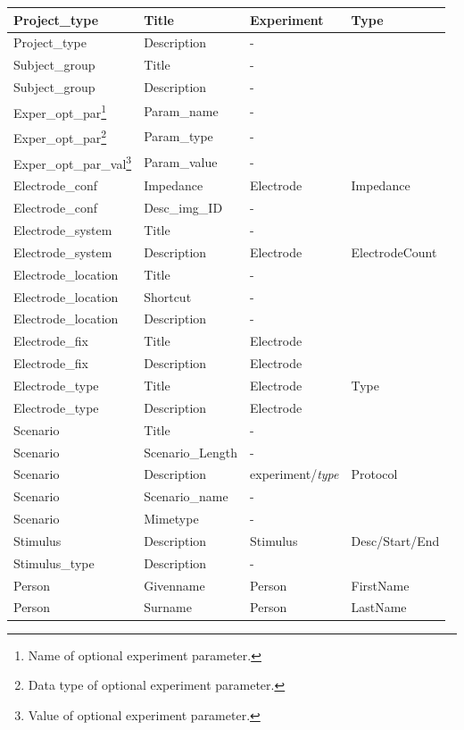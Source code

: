 \begin{longtable}{|l|l||l|l|}
 \hline 	 Project\_type & Title & Experiment & Type \\ 
 \hline 	 Project\_type & Description & - &  \\ 
 \hline 	 Subject\_group & Title &-  &  \\ 
 \hline 	 Subject\_group & Description & - &  \\ 
 \hline 	 Exper\_opt\_par\footnote{Name of optional experiment parameter.} & Param\_name & - &  \\ 
 \hline 	 Exper\_opt\_par\footnote{Data type of optional experiment parameter.} & Param\_type & - &  \\ 
 \hline 	 Exper\_opt\_par\_val\footnote{Value of optional experiment parameter.} & Param\_value & - &  \\ 
 \hline 	 Electrode\_conf & Impedance & Electrode & Impedance \\ 
 \hline 	 Electrode\_conf & Desc\_img\_ID & - &  \\ 
 \hline 	 Electrode\_system & Title & - &  \\ 
 \hline 	 Electrode\_system & Description & Electrode & ElectrodeCount \\ 
 \hline 	 Electrode\_location & Title & - &  \\ 
 \hline 	 Electrode\_location & Shortcut & - &  \\ 
 \hline 	 Electrode\_location & Description & - &  \\ 
 \hline 	 Electrode\_fix & Title & Electrode &  \\ 
 \hline 	 Electrode\_fix & Description & Electrode &  \\ 
 \hline 	 Electrode\_type & Title & Electrode & Type \\ 
 \hline 	 Electrode\_type & Description & Electrode &  \\ 
 \hline 	Scenario  & Title & - &  \\ 
 \hline 	Scenario  & Scenario\_Length & - &  \\ 
 \hline 	Scenario  & Description  & experiment/\textit{type} & Protocol \\ 
 \hline Scenario  & Scenario\_name & - &  \\ 
\hline Scenario  & Mimetype& - &  \\ 
\hline Stimulus & Description & Stimulus  & Desc/Start/End \\ 
	\hline Stimulus\_type & Description & - &  \\ 
	\hline Person & Givenname & Person & FirstName \\ 
	\hline Person & Surname & Person &LastName  \\ 

\end{longtable}
